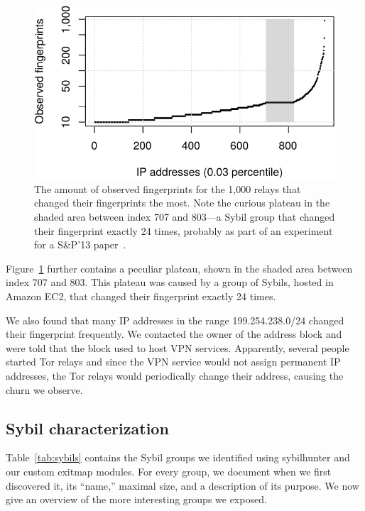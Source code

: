 \begin{figure}[t]
	\centering
	\includegraphics[width=\linewidth]{diagrams/fingerprints.pdf}
	\caption{The amount of observed fingerprints for the 1,000 relays that
	changed their fingerprints the most.  Note the curious plateau in the shaded
	area between index 707 and 803---a Sybil group that changed their
	fingerprint exactly 24 times, probably as part of an experiment for a
	S\&P'13 paper~\cite{Biryukov2013a}.}
	\label{fig:fingerprints}
\end{figure}

Figure~\ref{fig:fingerprints} further contains a peculiar plateau, shown in the
shaded area between index 707 and 803.  This plateau was caused by a group of
Sybils, hosted in Amazon EC2, that changed their fingerprint exactly 24 times.

We also found that many IP addresses in the range 199.254.238.0/24 changed their
fingerprint frequently.  We contacted the owner of the address block and were
told that the block used to host VPN services.  Apparently, several people
started Tor relays and since the VPN service would not assign permanent IP
addresses, the Tor relays would periodically change their address, causing the
churn we observe.

\subsection{Sybil characterization}
\label{sec:sybil_groups}
Table~\ref{tab:sybils} contains the Sybil groups we identified using sybilhunter
and our custom exitmap modules.  For every group, we document when we first
discovered it, its ``name,'' maximal size, and a description of its purpose.  We
now give an overview of the more interesting groups we exposed.


